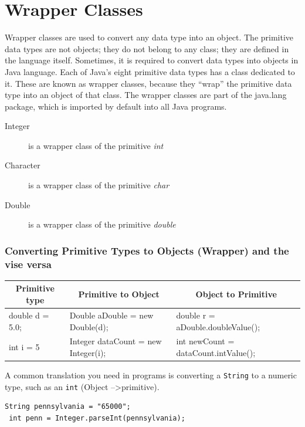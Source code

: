 \documentclass[11pt,a4paper]{article}
\begin{document}
 \section*{Wrapper Classes}
Wrapper classes are used to convert any data type into an object. The primitive data types are not objects; they do not belong to any class; they are defined in the language itself. Sometimes, it is required to convert data types into objects in Java language. Each of Java's eight primitive data types has a class dedicated to it. These are known as wrapper classes, because they ``wrap'' the primitive data type into an object of that class. The wrapper classes are part of the java.lang package, which is imported by default into all Java programs.
\begin{description}  
\item [Integer] is a wrapper class of the primitive \emph{int}
\item [Character] is a wrapper class of the primitive \emph{char}
\item [Double] is a wrapper class of the primitive \emph{double}
\end{description}

\subsubsection*{Converting Primitive Types to Objects (Wrapper) and the vise versa}
\begin{table}[H]
\centering
\begin{tabular}{|p{2.5 cm}|p{4 cm}|p{6 cm}|}  \hline

\multicolumn{1}{|c|}{\textbf{Primitive type} } & \multicolumn{1}{|c|}{\textbf{Primitive to Object}} & \multicolumn{1}{|c|}{\textbf{Object to Primitive}} \\\hline
 double d = 5.0; &Double aDouble = new Double(d);&double r = aDouble.doubleValue();\\ \hline
 int i = 5 &Integer dataCount = new Integer(i); &int newCount = dataCount.intValue(); \\ \hline
 \end{tabular}
\end{table}

A common translation you need in programs is converting a \lstinline!String! to a numeric type, such as an \lstinline!int! (Object --\textgreater  primitive).
\begin{lstlisting}[numbers=none]
 String pennsylvania = "65000";
 int penn = Integer.parseInt(pennsylvania);
\end{lstlisting}
\vfill{\ }
\end{document}
